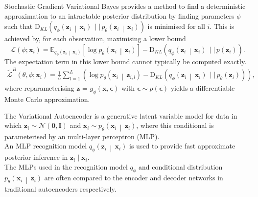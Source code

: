 \documentclass[landscape,a0b,final,a4resizeable]{include/a0poster}
\newcommand{\Func}[2]{#1 \left( #2\right)}
\newcommand{\FuncSq}[2]{#1 \left[ #2 \right]}
\newcommand{\CondFunc}[3]{#1 \left(#2 \, \middle\vert \, #3 \right)}
\newcommand{\pProb}[1]{\Func{p}{#1}}
\newcommand{\Expect}[2]{\FuncSq{\mathbb{E}_{#1}}{#2}}
\newcommand{\DivKL}[2]{\Func{\textrm{D}_{KL}}{#1 \, \mid \mid \, #2}}
\begin{document}
\begin{poster}
\begin{multicols}{3}
Stochastic Gradient Variational Bayes provides a method to find a deterministic approximation to an intractable posterior distribution by finding parameters $\phi$ such that $\DivKL{\CondFunc{q_\phi}{\mathbf{z}_i}{\mathbf{x}_i}}{\CondFunc{p_\theta}{\mathbf{z}_i}{\mathbf{x}_i}}$ is minimised for all $i$. This is achieved by, for each observation, maximising a lower bound
\begin{equation}
  \Func{\mathcal{L}}{\phi; \mathbf{x}_i} = \Expect{\CondFunc{q_\phi}{\mathbf{z}_i}{\mathbf{x}_i}}{\log \CondFunc{p_\theta}{\mathbf{x}_i}{\mathbf{z}_i}} - \DivKL{\CondFunc{q_\phi}{\mathbf{z}_i}{\mathbf{x}_i}}{\pProb{\mathbf{z}_i}}. \nonumber 
\end{equation}
The expectation term in this lower bound cannot typically be computed exactly.
\begin{align}
  \Func{\tilde{\mathcal{L}}^B}{\theta, \phi; \mathbf{x}_i} = \frac{1}{L} \sum_{l=1}^{L} \left( \log \CondFunc{p_\theta}{\mathbf{x}_i}{\mathbf{z}_{i,l}} - \DivKL{\CondFunc{q_{\phi}}{\mathbf{z}_i}{\mathbf{x}_i}}{\Func{p_\theta}{\mathbf{z}_i}} \right), \nonumber 
\end{align}
where reparameterising $\mathbf{\mathbf{z}}$ = $g_\phi(\mathbf{x}, \mathbf{\epsilon})$ with  $\mathbf{\epsilon} \sim p(\mathbf{\epsilon})$ yields a differentiable Monte Carlo approximation.

\vspace{0.5in}

The Variational Autoencoder is a generative latent variable model for data in which $\mathbf{z}_i \sim \mathcal{N}(\mathbf{0}, \mathbf{I})$ and $\mathbf{x}_i \sim \CondFunc{p_\theta}{\mathbf{x}_i}{\mathbf{z}_i}$, where this conditional is parameterised by an multi-layer perceptron (MLP).\\

An MLP recognition model $\CondFunc{q_\phi}{\mathbf{z}_i}{\mathbf{x}_i}$ is used to provide fast approximate posterior inference in $\mathbf{z}_i \mid \mathbf{x}_i$.\\

The MLPs used in the recognition model $q_\phi$ and conditional distribution $\CondFunc{p_\theta}{\mathbf{x}_i}{\mathbf{z}_i}$ are often compared to the encoder and decoder networks in traditional autoencoders respectively.



\newpage %



\end{multicols}
\end{poster}
\end{document}
